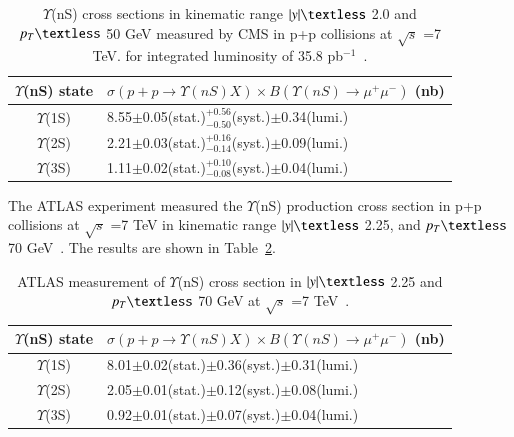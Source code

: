 \begin{table}
  \begin{center}
    \caption[]{ $\Upsilon$(nS) cross sections
  in kinematic range $|y|\textless$ 2.0 and $p_{T}\textless$ 50 GeV 
      measured by CMS in p+p collisions at $\surd s$ =7 TeV.
  for integrated luminosity of 35.8 pb$^{-1}$~\cite{CMS:2015xqv}.}
\label{Tab:CMSYCrossPLB}
\begin{tabular}{cl} 
\hline 
\hline
$\Upsilon$(nS) state             &$ \sigma(p+p \rightarrow \Upsilon(nS)X) \times B(\Upsilon(nS)\rightarrow\mu^{+}\mu^{-})$ (nb)    \\              
\hline
$\Upsilon$(1S)                   &8.55$\pm$0.05(stat.)$^{+0.56}_{-0.50}$(syst.)$\pm$0.34(lumi.)\\
$\Upsilon$(2S)                   &2.21$\pm$0.03(stat.)$^{+0.16}_{-0.14}$(syst.)$\pm$0.09(lumi.)\\
$\Upsilon$(3S)                   &1.11$\pm$0.02(stat.)$^{+0.10}_{-0.08}$(syst.)$\pm$0.04(lumi.)\\
\hline
\hline
\end{tabular}
\end{center}
\end{table}


The ATLAS experiment measured the $\Upsilon$(nS) production cross section
in p+p collisions at $\surd s$ =7 TeV in kinematic range $|y|\textless$ 2.25,
and $p_{T}\textless$ 70 GeV~\cite{ATLAS:2012lmu}.  
The results are shown in Table~\ref{Tab:ATLASYCross}.


\begin{table}
  \begin{center}
    \caption[]{ATLAS measurement of $\Upsilon$(nS) cross section in $|y|\textless$ 2.25 and $p_{T}\textless$ 70 GeV
      at $\surd s$ =7 TeV~\cite{ATLAS:2012lmu}.}
\label{Tab:ATLASYCross}
\begin{tabular}{cl} 
\hline 
\hline
$\Upsilon$(nS) state             &$ \sigma(p+p \rightarrow \Upsilon(nS)X) \times B(\Upsilon(nS)\rightarrow\mu^{+}\mu^{-})$ (nb)    \\              
\hline
$\Upsilon$(1S)                   &8.01$\pm$0.02(stat.)$\pm$0.36(syst.)$\pm$0.31(lumi.)\\
$\Upsilon$(2S)                   &2.05$\pm$0.01(stat.)$\pm$0.12(syst.)$\pm$0.08(lumi.)\\
$\Upsilon$(3S)                   &0.92$\pm$0.01(stat.)$\pm$0.07(syst.)$\pm$0.04(lumi.)\\
\hline
\hline
\end{tabular}
\end{center}
\end{table}

